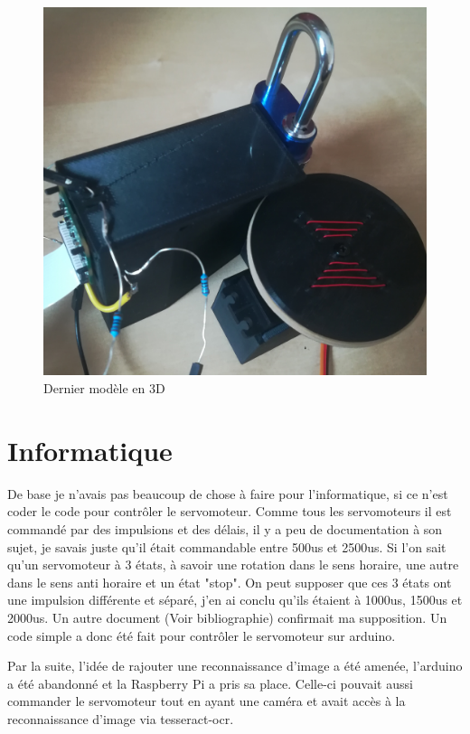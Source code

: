 \documentclass[twoside]{article}
\begin{document}
\begin{multicols}{2}
\begin{figure}[H]
\centering
\includegraphics[scale=0.1]{modelefinalirl.jpg}
\caption{Dernier modèle en 3D}
\end{figure}


\section{Informatique}

De base je n'avais pas beaucoup de chose à faire pour l'informatique, si ce n'est coder le code pour contrôler le servomoteur. Comme tous les servomoteurs il est commandé par des impulsions et des délais, il y a peu de documentation à son sujet, je savais juste qu'il était commandable entre 500us et 2500us. Si l'on sait qu'un servomoteur à 3 états, à savoir une rotation dans le sens horaire, une autre dans le sens anti horaire et un état "stop". On peut supposer que ces 3 états ont une impulsion différente et séparé, j'en ai conclu qu'ils étaient à 1000us, 1500us et 2000us. Un autre document (Voir bibliographie) confirmait ma supposition. Un code simple a donc été fait pour contrôler le servomoteur sur arduino.

Par la suite, l'idée de rajouter une reconnaissance d'image a été amenée, l'arduino a été abandonné et la Raspberry Pi a pris sa place. Celle-ci pouvait aussi commander le servomoteur tout en ayant une caméra et avait accès à la reconnaissance d'image via tesseract-ocr.


\end{multicols}
\end{document}
